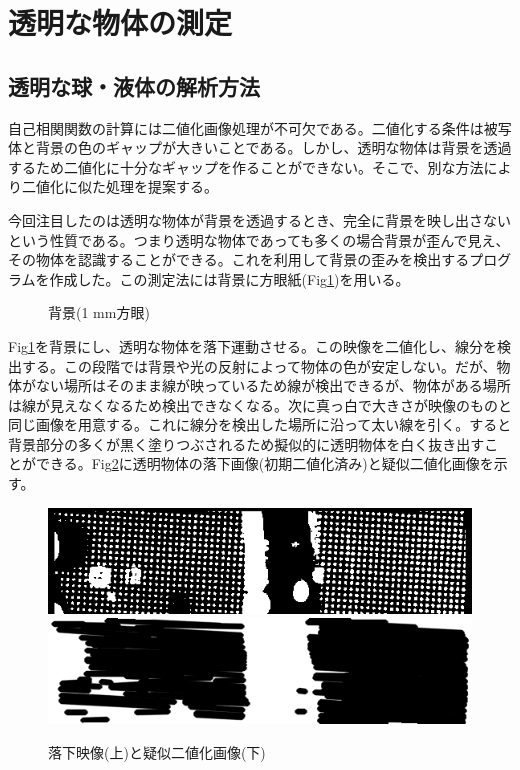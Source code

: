\documentclass[a4paper,12pt,dvipdfmx]{jsarticle}
\begin{document}
\section{透明な物体の測定}
\subsection{透明な球・液体の解析方法}
自己相関関数の計算には二値化画像処理が不可欠である。二値化する条件は被写体と背景の色のギャップが大きいことである。しかし、透明な物体は背景を透過するため二値化に十分なギャップを作ることができない。そこで、別な方法により二値化に似た処理を提案する。 \par
今回注目したのは透明な物体が背景を透過するとき、完全に背景を映し出さないという性質である。つまり透明な物体であっても多くの場合背景が歪んで見え、その物体を認識することができる。これを利用して背景の歪みを検出するプログラムを作成した。この測定法には背景に方眼紙(Fig\ref{fig:block})を用いる。
\begin{figure}[H]
	\centering
	\caption{背景(1 mm方眼)}
	\label{fig:block}
\end{figure}
Fig\ref{fig:block}を背景にし、透明な物体を落下運動させる。この映像を二値化し、線分を検出する。この段階では背景や光の反射によって物体の色が安定しない。だが、物体がない場所はそのまま線が映っているため線が検出できるが、物体がある場所は線が見えなくなるため検出できなくなる。次に真っ白で大きさが映像のものと同じ画像を用意する。これに線分を検出した場所に沿って太い線を引く。すると背景部分の多くが黒く塗りつぶされるため擬似的に透明物体を白く抜き出すことができる。Fig\ref{fig:line}に透明物体の落下画像(初期二値化済み)と疑似二値化画像を示す。
\begin{figure}[H]
	\includegraphics[scale=0.4]{water_two.png}
	\includegraphics[scale=0.4]{water_line.png}
	\caption{落下映像(上)と疑似二値化画像(下)}
	\label{fig:line}
\end{figure}
\end{document}
